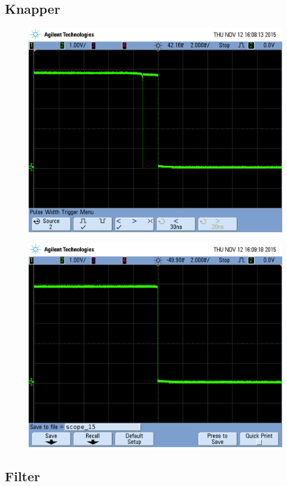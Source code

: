 \subsection{Knapper} \label{title:buttons}
\begin{figure}[H]
	\includegraphics[width = \textwidth]{billeder/scope_14.png}
	\caption{}\label{fig:withbounce}
\end{figure}
\begin{figure}[H]
	\includegraphics[trim = 0 30 0 0, clip=true, width = \textwidth]{billeder/scope_15.png}
	\caption{}\label{fig:withoutbounce}
\end{figure}


\subsection{Filter}